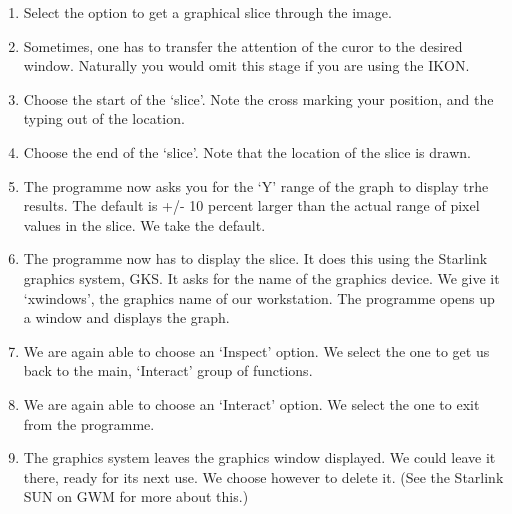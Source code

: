 {{\begin{enumerate}
\item Select the option to get a graphical slice through the image.
\item Sometimes, one has to transfer the attention of the curor
      to the desired window. Naturally you would omit this stage
      if you are using the IKON.
\item Choose the start of the `slice'. Note the cross marking your
      position, and the typing out of the location.
\item Choose the end of the `slice'. Note that the location of
      the slice is drawn.
\item The programme now asks you for the `Y' range of the graph
      to display trhe results. The default is +/- 10 percent
      larger than the actual range of pixel values in the slice.
      We take the default.
\item The programme now has to display the slice. It does this
      using the Starlink graphics system, GKS. It asks for the
      name of the graphics device. We give it `xwindows', the
      graphics name of our workstation. The programme opens up
      a window and displays the graph.
\item We are again able to choose an `Inspect' option. We select
      the one to get us back to the main, `Interact' group of
      functions.
\item We are again able to choose an `Interact' option. We select
      the one to exit from the programme.
\item The graphics system leaves the graphics window displayed.
      We could leave it there, ready for its next use. We choose
      however to delete it. (See the Starlink SUN on GWM for more
      about this.)
\end{enumerate}


}}
